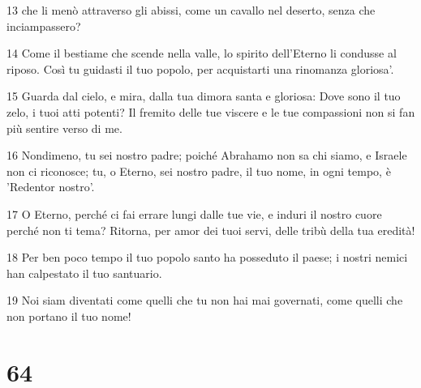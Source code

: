 \par 13 che li menò attraverso gli abissi, come un cavallo nel deserto, senza che inciampassero?
\par 14 Come il bestiame che scende nella valle, lo spirito dell'Eterno li condusse al riposo. Così tu guidasti il tuo popolo, per acquistarti una rinomanza gloriosa'.
\par 15 Guarda dal cielo, e mira, dalla tua dimora santa e gloriosa: Dove sono il tuo zelo, i tuoi atti potenti? Il fremito delle tue viscere e le tue compassioni non si fan più sentire verso di me.
\par 16 Nondimeno, tu sei nostro padre; poiché Abrahamo non sa chi siamo, e Israele non ci riconosce; tu, o Eterno, sei nostro padre, il tuo nome, in ogni tempo, è 'Redentor nostro'.
\par 17 O Eterno, perché ci fai errare lungi dalle tue vie, e induri il nostro cuore perché non ti tema? Ritorna, per amor dei tuoi servi, delle tribù della tua eredità!
\par 18 Per ben poco tempo il tuo popolo santo ha posseduto il paese; i nostri nemici han calpestato il tuo santuario.
\par 19 Noi siam diventati come quelli che tu non hai mai governati, come quelli che non portano il tuo nome!

\chapter{64}

